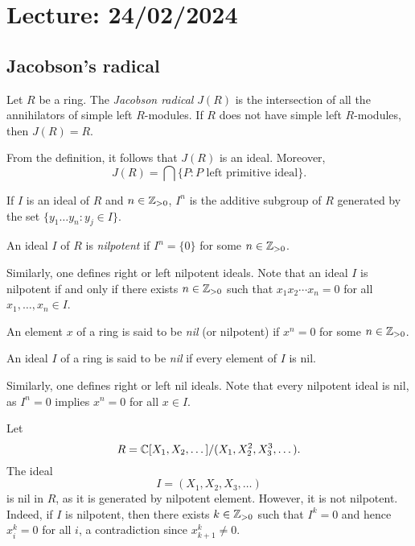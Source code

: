 \section{Lecture: 24/02/2024}
\label{04}


\subsection{Jacobson's radical}

\begin{definition}
Let $R$ be a ring. The \emph{Jacobson radical} $J(R)$
is the intersection of all the annihilators of simple left $R$-modules. If $R$ does not
have simple left $R$-modules, then $J(R)=R$. 
\end{definition}

From the definition, it follows
that $J(R)$ is an ideal. Moreover, 
	\[
		J(R)=\bigcap\{P:\text{$P$ left primitive ideal}\}.
	\]

	If $I$ is an ideal of $R$ and $n\in\mathbb{Z}_{>0}$, $I^n$ is the additive subgroup of $R$ 
generated by the set $\{y_1\dots y_n:y_j\in I\}$. 

\begin{definition}
An ideal $I$ of $R$ is \emph{nilpotent} 
if $I^n=\{0\}$ for some $n\in\mathbb{Z}_{>0}$.
\end{definition}

Similarly, one defines right or left nilpotent ideals. 
Note that an ideal $I$ is nilpotent if and only if there exists $n\in\mathbb{Z}_{>0}$ such that 
$x_1x_2\cdots x_n=0$ for all $x_1,\dots,x_n\in I$.  

\begin{definition}
	An element $x$ of a ring is said to be \emph{nil} (or nilpotent) if $x^n=0$ for some $n\in\mathbb{Z}_{>0}$. 
\end{definition}

\begin{definition}
An ideal $I$ of a ring is said to be \emph{nil} if every element of $I$ is nil. 
\end{definition}

Similarly, one defines right or left nil ideals. 
Note that every nilpotent ideal is nil, as $I^n=0$ implies $x^n=0$ for all 
$x\in I$.

\begin{example}
	Let \[
 R=\mathbb{C}[X_1,X_2,\dots]/(X_1,X_2^2,X_3^3,\dots).
    \]
    The ideal 
	\[ 
    I=(X_1,X_2,X_3,\dots)
    \]
    is nil in $R$, as it is generated by nilpotent element. However, it is not nilpotent. Indeed, if $I$ is nilpotent, then there exists $k\in\mathbb{Z}_{>0}$ such that 
	$I^k=0$ and hence $x_i^k=0$ for all $i$, a contradiction since 
	$x_{k+1}^k\ne0$. 	
\end{example}

